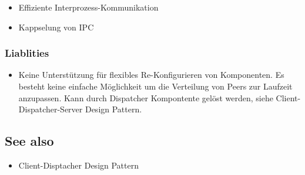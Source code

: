 \begin{itemize}
	\item Effiziente Interprozess-Kommunikation
	\item Kappselung von IPC
\end{itemize}

\subsubsection*{Liablities}


\begin{itemize}
	\item Keine Unterstützung für flexibles Re-Konfigurieren von Komponenten. Es besteht keine einfache Möglichkeit um die Verteilung von Peers zur Laufzeit anzupassen. Kann durch Dispatcher Kompontente gelöst werden, siehe Client-Dispatcher-Server Design Pattern.
\end{itemize}

\subsection*{See also}


\begin{itemize}
	\item Client-Disptacher Design Pattern
\end{itemize}


